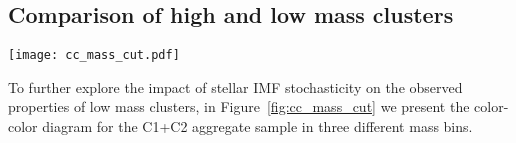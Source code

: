 \documentclass[linenumbers]{aastex63}
\begin{document}
{\subsection{Comparison of high and low mass clusters}\label{ssect:cc_mag_m_star}
%
\begin{figure*} 
\texttt{[image: cc\_mass\_cut.pdf]}
 \caption{Color-color diagram of ML classified class 1 and 2 clusters in three bins of stellar mass. The most massive clusters with ${\rm M_{*} > 10^4 M_{\odot}}$ are shown in the left panel, intermediate masses of ${5\times10^3 M_{\odot} > \rm M_{*} < 10^4 M_{\odot}}$ are in the middle panel, and low mass clusters of ${\rm M_{*} < 5\times10^3 M_{\odot}}$ are in the right panel. Similar to Figure\,\ref{fig:cc_compare}, we use a density heat map to illustrate the distribution of clusters.}
 \label{fig:cc_mass_cut}
\end{figure*}
%

To further explore the impact of stellar IMF stochasticity on the observed properties of low mass clusters, in Figure~\ref{fig:cc_mass_cut} we present the color-color diagram for the C1+C2 aggregate sample in three different mass bins.

}
\end{document}

